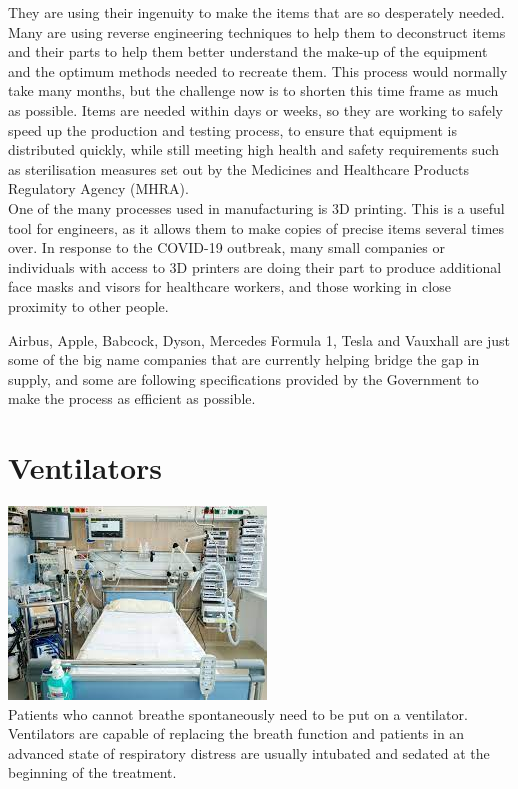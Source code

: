 \documentclass[12pt]{article}
\begin{document}
They are using their ingenuity to make the items that are so desperately needed. Many are using reverse engineering techniques to help them to deconstruct items and their parts to help them better understand the make-up of the equipment and the optimum methods needed to recreate them. This process would normally take many months, but the challenge now is to shorten this time frame as much as possible. Items are needed within days or weeks, so they are working to safely speed up the production and testing process, to ensure that equipment is distributed quickly, while still meeting high health and safety requirements such as sterilisation measures set out by the Medicines and Healthcare Products Regulatory Agency (MHRA).
\\

One of the many processes used in manufacturing is 3D printing. This is a useful tool for engineers, as it allows them to make copies of precise items several times over. In response to the COVID-19 outbreak, many small companies or individuals with access to 3D printers are doing their part to produce additional face masks and visors for healthcare workers, and those working in close proximity to other people.


Airbus, Apple, Babcock, Dyson, Mercedes Formula 1, Tesla and Vauxhall are just some of the big name companies that are currently helping bridge the gap in supply, and some are following specifications provided by the Government to make the process as efficient as possible.

\section{Ventilators}
\includegraphics[scale=0.7]{ven.jpeg}\\
Patients who cannot breathe spontaneously need to be put on a ventilator. Ventilators are capable of replacing the breath function and patients in an advanced state of respiratory distress are usually intubated and sedated at the beginning of the treatment.
\end{document}
